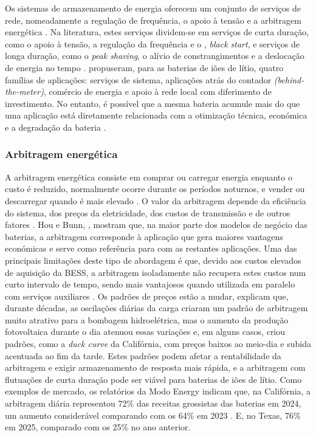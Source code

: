 Os sistemas de armazenamento de energia oferecem um conjunto de serviços de rede, nomeadamente a regulação de frequência, o apoio à tensão e a arbitragem energética \cite{ZhaoZ2023 }\cite{ Zhao2023}. Na literatura, estes serviços dividem-se em serviços de curta duração, como o apoio à tensão, a regulação da frequência e o , \textit{black start}, e serviços de longa duração, como o \textit{peak shaving}, o alívio de constrangimentos e a deslocação de energia no tempo \cite{ Prakash2022}. \textcite{ Hesse2017} propuseram, para as baterias de iões de lítio, quatro famílias de aplicações: serviços de sistema, aplicações atrás do contador \textit{(behind-the-meter)}, comércio de energia e apoio à rede local com diferimento de investimento. No entanto, é possível que a mesma bateria acumule mais do que uma aplicação está diretamente relacionada com a otimização técnica, económica e a degradação da bateria \cite{ Zhao2023}.  


\subsubsection{Arbitragem energética}
\label{sec:Ch2.1.6.1}

A arbitragem energética consiste em comprar ou carregar energia enquanto o custo é reduzido, normalmente ocorre durante os períodos noturnos, e vender ou descarregar quando é mais elevado \cite{ZhaoZ2023 }. O valor da arbitragem depende da eficiência do sistema, dos preços da eletricidade, dos custos de transmissão e de outros fatores \cite{ Al-Hallaj2018}. 
Hou e Bunn, \cite{Hou2024 }, mostram que, na maior parte dos modelos de negócio das baterias, a arbitragem corresponde à aplicação que gera maiores vantagens económicas e serve como referência para com as restantes aplicações. Uma das principais limitações deste tipo de abordagem é que, devido aos custos elevados de aquisição da BESS, a arbitragem isoladamente não recupera estes custos num curto intervalo de tempo, sendo mais vantajosos quando utilizada em paralelo com serviços auxiliares \cite{ Al-Hallaj2018}. 
Os padrões de preços estão a mudar, \cite{ Hesse2017} explicam que, durante décadas, as oscilações diárias da carga criaram um padrão de arbitragem muito atrativo para a bombagem hidroelétrica, mas o aumento da produção fotovoltaica durante o dia atenuou essas variações e, em alguns casos, criou padrões, como a \textit{duck curve} da Califórnia, com preços baixos ao meio-dia e subida acentuada ao fim da tarde. Estes padrões podem afetar a rentabilidade da arbitragem e exigir armazenamento de resposta mais rápida, e a arbitragem com flutuações de curta duração pode ser viável para baterias de iões de lítio. Como exemplos de mercado, os relatórios da Modo Energy indicam que, na Califórnia, a arbitragem diária representou 72\% das receitas grossistas das baterias em 2024, um aumento considerável comparando com os 64\% em 2023 \cite{Hou2024 }. E, no Texas, 76\% em 2025, comparado com os 25\% no ano anterior. 

